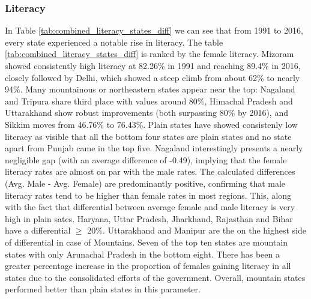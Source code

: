 \subsubsection{Literacy}
In Table \ref{tab:combined_literacy_states_diff} we can see that from 1991 to 2016, every state experienced a notable rise in literacy. The table \ref{tab:combined_literacy_states_diff} is ranked by the female literacy. Mizoram showed consistently high literacy at 82.26\% in 1991 and reaching 89.4\% in 2016, closely followed by Delhi, which showed a steep climb from about 62\% to nearly 94\%. Many mountainous or northeastern states appear near the top: Nagaland and Tripura share third place with values around 80\%, Himachal Pradesh and Uttarakhand show robust improvements (both surpassing 80\% by 2016), and Sikkim moves from 46.76\% to 76.43\%. Plain states have showed consistenly low literacy as visible that all the bottom four states are plain states and no state apart from Punjab came in the top five. Nagaland interestingly presents a nearly negligible gap (with an average difference of -0.49), implying that the female literacy rates are almost on par with the male rates. The calculated differences (Avg. Male - Avg. Female) are predominantly positive, confirming that male literacy rates tend to be higher than female rates in most regions.  This, along with  the fact that differential between average female and male literacy is very high in plain sates. Haryana, Uttar Pradesh, Jharkhand, Rajasthan and Bihar have a differential $\geq$ 20\%. Uttarakhand and Manipur are the on the highest side of differential in case of Mountains. Seven of the top ten states are mountain states with only Arunachal Pradesh in the bottom eight.  There has been a greater percentage increase in the proportion of females gaining literacy in all states due to the consolidated efforts of the government. Overall, mountain states performed better than plain states in this parameter.
